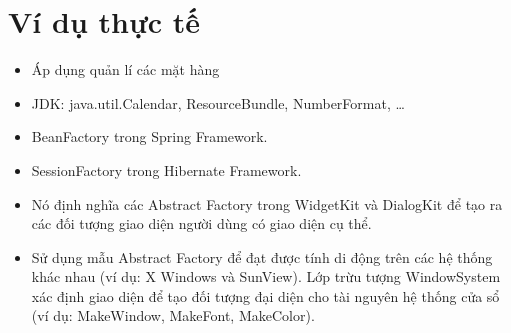 \section{Ví dụ thực tế}
\begin{itemize}
    \item Áp dụng quản lí các mặt hàng
    \item JDK: java.util.Calendar, ResourceBundle, NumberFormat, …
    \item BeanFactory trong Spring Framework.
    \item SessionFactory trong Hibernate Framework.
    \item Nó định nghĩa các Abstract Factory trong WidgetKit và DialogKit để tạo ra các đối tượng giao diện người dùng có giao diện cụ thể.
    \item Sử dụng mẫu Abstract Factory để đạt được tính di động trên các hệ thống khác nhau (ví dụ: X Windows và SunView). Lớp trừu tượng WindowSystem xác định giao diện để tạo đối tượng đại diện cho tài nguyên hệ thống cửa sổ (ví dụ: MakeWindow, MakeFont, MakeColor).
\end{itemize}

